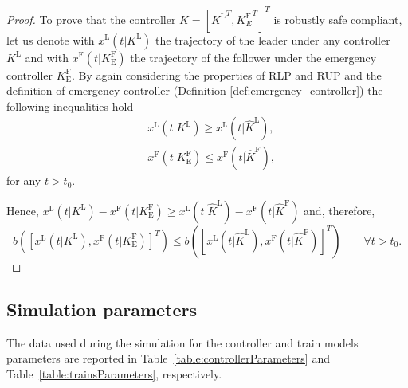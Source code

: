 \documentclass[letterpaper, 10 pt, conference]{ieeeconf}
\newcounter{Definition}
\theoremstyle{definition}
\theoremstyle{nopoint}
\newcommand{\tildeAdd}{~}
\begin{document}
\begin{proof}
	To prove that the controller $K=[{K^\mathrm{L}}^T, {K^\mathrm{F}_E}^T]^T$ is robustly safe compliant, let us denote with
	$x^\mathrm{L}(t | K^\mathrm{L})$ the trajectory of the leader under any controller $K^\mathrm{L}$ and with $x^\mathrm{F}(t | K_\mathrm{E}^\mathrm{F})$ the trajectory of the follower under the emergency controller $K_\mathrm{E}^\mathrm{F}$.  
	By again considering the properties of RLP and RUP and 
	the definition of emergency controller (Definition \ref{def:emergency_controller}) the following inequalities hold
	\begin{eqnarray}
		&x^\mathrm{L}(t | K^\mathrm{L})\geq x^\mathrm{L}(t | \hat{K}^\mathrm{L}), \label{eq:inequality2_leader}\\
		& x^\mathrm{F}(t | K_\mathrm{E}^\mathrm{F})\leq x^\mathrm{F}(t | \hat{K}^\mathrm{F}),\label{eq:inequality2_follower}
	\end{eqnarray}
	for any $t>t_0$.
	
	Hence, $x^\mathrm{L}(t | K^\mathrm{L})-x^\mathrm{F}(t | K_\mathrm{E}^\mathrm{F}) \geq x^\mathrm{L}(t | \hat{K}^\mathrm{L})-x^\mathrm{F}(t | \hat{K}^\mathrm{F})$ and, therefore, 
	\begin{equation*}
		b([x^\mathrm{L}(t | K^\mathrm{L}),x^\mathrm{F}(t |K_\mathrm{E}^\mathrm{F})]^T)\leq  b([x^\mathrm{L}(t | \hat{K}^\mathrm{L}),x^\mathrm{F}(t |\hat{K}^\mathrm{F})]^T) \qquad \forall t>t_0. 
	\end{equation*}
	
	
\end{proof}





\subsection{Simulation parameters}
\label{appendix:parameters}


The data used during the simulation for the controller and train models parameters are reported in Table\tildeAdd\ref{table:controllerParameters} and Table\tildeAdd\ref{table:trainsParameters}, respectively.
\end{document}
